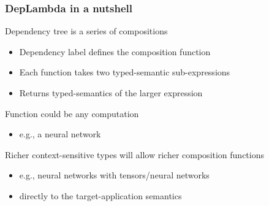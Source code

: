 \documentclass[mathserif,12pt]{beamer}
\begin{document}
\begin{frame}
\frametitle{DepLambda in a nutshell}

Dependency tree is a series of compositions
\begin{itemize}
 \item Dependency label defines the composition function
 \item Each function takes two typed-semantic sub-expressions
 \item Returns typed-semantics of the larger expression
\end{itemize}


\vspace{1em}
\pause

Function could be any computation
\begin{itemize}
  \item e.g., a neural network
\end{itemize}

\vspace{1em}
\pause

Richer context-sensitive types will allow richer composition functions
\begin{itemize}
 \item e.g., neural networks with tensors/neural networks
 \item directly to the target-application semantics
\end{itemize}
\end{frame}
\end{document}
